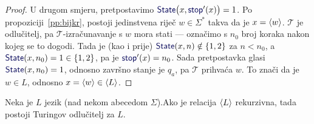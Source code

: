 \begin{proof}
U drugom smjeru, pretpostavimo $\f{State}\bigl(x,\f{stop}'(x)\bigr)=1$. Po propoziciji~\ref{pp:bijkr}, postoji jedinstvena riječ $w\in\Sigma^*$ takva da je $x=\langle w\rangle$. $\mathcal T$ je odlučitelj, pa $\mathcal T$-izračunavanje s $w$ mora stati --- označimo s $n_0$ broj koraka nakon kojeg se to dogodi. Tada je (kao i prije) $\f{State}(x,n)\notin\{1,2\}$ za $n<n_0$, a $\f{State}(x,n_0)=1\in\{1,2\}$, pa je $\f{stop}'(x)=n_0$. Sada pretpostavka glasi $\f{State}(x,n_0)=1$, odnosno završno stanje je $q_a$, pa $\mathcal T$ prihvaća $w$. To znači da je $w\in L$, odnosno $x=\langle w\rangle\in\langle L\rangle$.
\end{proof}

\begin{teorem}[{name=[Turing-odlučivost rekurzivnog jezika]}]\label{tm:krio}
Neka je $L$ jezik (nad nekom abecedom $\Sigma$).\newline Ako je relacija $\langle L\rangle$ rekurzivna, tada postoji Turingov odlučitelj za $L$.
\end{teorem}
